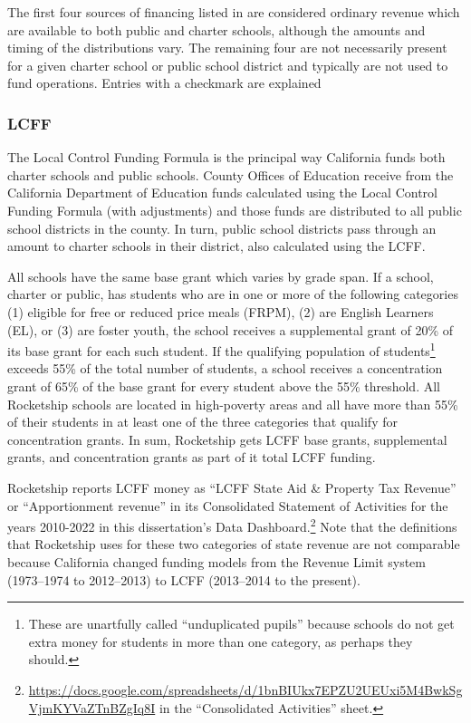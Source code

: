 The first four sources of financing listed in  are considered ordinary revenue which are available to both public and charter schools, although the amounts and timing of the distributions vary. The remaining four are not necessarily present for a given charter school or public school district and typically are not used to fund operations. Entries with a checkmark are explained 

\subsubsection{LCFF}%
\label{sec:lcff}\indent%

The Local Control Funding Formula is the principal way California funds both charter schools and public schools. County Offices of Education receive from the California Department of Education funds calculated using the Local Control Funding Formula (with adjustments) and those funds are distributed to all public school districts in the county. In turn, public school districts 
pass through an amount to charter schools in their district, also calculated using the LCFF.

All schools have the same base grant which varies by grade span. If a school, charter or public, has students who are in one or more of the following categories (1) eligible for free or reduced price meals (FRPM), (2) are English Learners (EL), or (3) are foster youth, the school receives a supplemental grant of 20\% of its base grant for each such student. If the qualifying population of students\footnote{These are unartfully called ``unduplicated pupils'' because schools do not get extra money for students in more than one category, as perhaps they should.} exceeds 55\% of the total number of students, a school receives a concentration grant of 65\% of the base grant for every student above the 55\% threshold. All Rocketship schools are located in high-poverty areas and all have more than 55\% of their students in at least one of the three categories that qualify for concentration grants. In sum, Rocketship gets LCFF base grants, supplemental grants, and concentration grants as part of it total LCFF funding.

Rocketship reports LCFF money as ``LCFF State Aid \& Property Tax Revenue'' or ``Apportionment revenue'' in its Consolidated Statement of Activities for the years 2010-2022 in this dissertation's Data Dashboard.\footnote{\url{https://docs.google.com/spreadsheets/d/1bnBIUkx7EPZU2UEUxi5M4BwkSgVjmKYVaZTnBZgIq8I} in the ``Consolidated Activities'' sheet.} Note that the definitions that Rocketship uses for these two categories of state revenue  are not comparable because California changed funding models from the Revenue Limit system (1973–1974 to 2012–2013) to LCFF (2013–2014 to the present).

